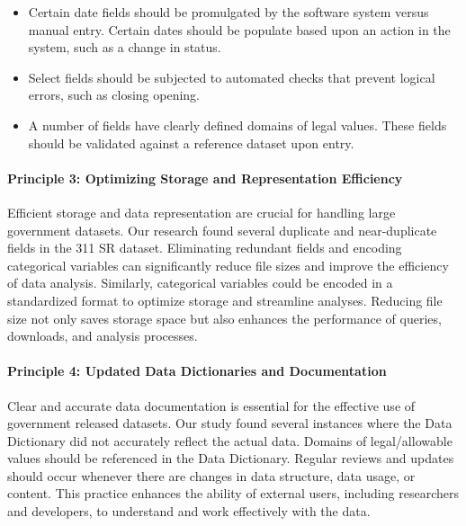 \documentclass[linenumber]{jdsart}
\begin{document}
\begin{itemize}[left=1.5em]
    \item Certain date fields should be promulgated by the software
    system versus manual entry. Certain dates should be populate 
    based upon an action in the system, such as a change in status. 
       
    \item Select fields should be subjected to automated checks 
    that prevent logical errors, such as closing opening. 
    
    \item A number of fields have clearly defined domains of legal
    values. These fields should be validated against a reference 
    dataset upon entry. 
 \end{itemize}


\paragraph{Principle 3: Optimizing Storage and Representation Efficiency}
Efficient storage and data representation are crucial for handling 
large government datasets. Our research found several duplicate and
near\mbox{-}duplicate fields in the 311 SR dataset. Eliminating 
redundant fields and encoding categorical variables can 
significantly reduce file sizes and improve the efficiency 
of data analysis. Similarly, categorical variables could be 
encoded in a standardized format to optimize storage and 
streamline analyses. Reducing file size not only saves 
storage space but also enhances the performance of queries, 
downloads,  and analysis processes.


\paragraph{Principle 4: Updated Data Dictionaries and Documentation}
Clear and accurate data documentation is essential for the effective use 
of government released datasets. Our study found several 
instances where the Data Dictionary did not accurately reflect the 
actual data. Domains of legal/allowable values should be referenced
in the Data Dictionary. Regular reviews and updates should 
occur whenever there are changes in data structure, data usage, or 
content. This practice enhances the ability of external users, 
including researchers and developers, to understand and work 
effectively with the data.
\end{document}
